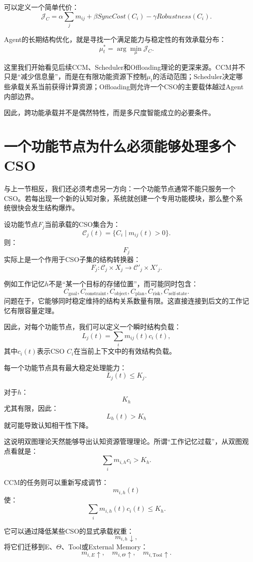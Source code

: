 可以定义一个简单代价：
\[
\mathcal J_C
=
\alpha
\sum_jm_{ij}
+
\beta
SyncCost(C_i)
-
\gamma
Robustness(C_i).
\]

Agent的长期结构优化，就是寻找一个满足能力与稳定性的有效承载分布：
\[
\mu_t^*
=
\arg\min_{\mu}
\mathcal J_C.
\]

这里我们开始看见后续CCM、Scheduler和Offloading理论的更深来源。CCM并不只是“减少信息量”，而是在有限功能资源下控制$\mu_t$的活动范围；Scheduler决定哪些承载关系当前获得计算资源；Offloading则允许一个CSO的主要载体越过Agent内部边界。

因此，跨功能承载并不是偶然特性，而是多尺度智能成立的必要条件。

\section{一个功能节点为什么必须能够处理多个CSO}

与上一节相反，我们还必须考虑另一方向：一个功能节点通常不能只服务一个CSO。若每出现一个新的认知对象，系统就创建一个专用功能模块，那么整个系统很快会发生结构爆炸。

设功能节点$F_j$当前承载的CSO集合为：
\[
\mathcal C_j(t)
=
\{
C_i
\mid
m_{ij}(t)>0
\}.
\]
则：
\[
F_j
\]
实际上是一个作用于CSO子集的结构转换器：
\[
F_j:
\mathcal C_j
\times
X_j
\rightarrow
\mathcal C'_j
\times
X'_j.
\]

例如工作记忆$h$不是“某一个目标的存储位置”，而可能同时包含：
\[
C_{\text{goal}},
C_{\text{constraint}},
C_{\text{object}},
C_{\text{plan}},
C_{\text{risk}},
C_{\text{self-state}}.
\]
问题在于，它能够同时稳定维持的结构关系数量有限。这直接连接到后文的工作记忆有限容量定理。

因此，对每个功能节点，我们可以定义一个瞬时结构负载：
\[
L_j(t)
=
\sum_i
m_{ij}(t)c_i(t),
\]
其中$c_i(t)$表示CSO $C_i$在当前上下文中的有效结构负载。

每一个功能节点具有最大稳定处理能力：
\[
L_j(t)
\leq
K_j.
\]

对于$h$：
\[
K_h
\]
尤其有限，因此：
\[
L_h(t)>K_h
\]
就可能导致认知相干性下降。

这说明双图理论天然能够导出认知资源管理理论。所谓“工作记忆过载”，从双图观点看就是：
\[
\boxed{
\sum_i m_{i,h}c_i
>
K_h.
}
\]

CCM的任务则可以重新写成调节：
\[
m_{i,h}(t)
\]
使：
\[
\sum_i m_{i,h}(t)c_i(t)
\le K_h.
\]

它可以通过降低某些CSO的显式承载权重：
\[
m_{i,h}\downarrow,
\]
将它们迁移到E、$\Theta$、Tool或External Memory：
\[
m_{i,E}\uparrow,
\quad
m_{i,\Theta}\uparrow,
\quad
m_{i,\text{Tool}}\uparrow.
\]

